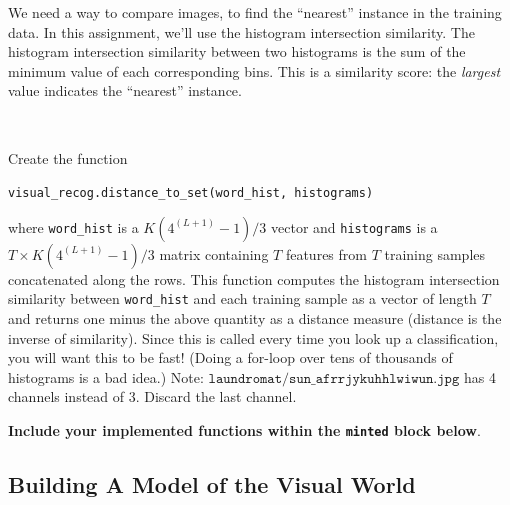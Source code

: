 \documentclass[11pt]{article}
\numberwithin{equation}{section} %
\numberwithin{figure}{section} %
\numberwithin{table}{section} %
\begin{document}
We need a way to compare images, to find the ``nearest'' instance in the training data.
In this assignment, we'll use the histogram intersection similarity. The histogram
intersection similarity between two histograms is the sum of the minimum value of each corresponding bins.
This is a similarity score: the {\it largest} value indicates the ``nearest'' instance.
\par ~
\par {}
Create the function
\begin{center}
{\tt visual\_recog.distance\_to\_set(word\_hist, histograms)}
\end{center}
where {\tt word\_hist} is a $K\left(4^{(L+1)}-1\right)/3$ vector
and {\tt histograms} is a $T \times K\left(4^{(L+1)}-1\right)/3$ matrix containing $T$ features
from $T$ training samples concatenated along the rows. This function
computes the histogram intersection similarity between {\tt word\_hist}
and each training sample as a vector of length $T$ and returns one minus the above quantity as a distance measure (distance is the inverse of similarity).
Since this is called every time you look up a classification, you will want this to be fast! (Doing a for-loop over tens of thousands of histograms is a bad idea.) Note: $\texttt{laundromat/sun\_afrrjykuhhlwiwun.jpg}$ has 4 channels instead of 3. Discard the last channel.

\textbf{Include your implemented functions  within the \texttt{minted} block below}.


\subsection{Building A Model of the Visual World}
\end{document}
